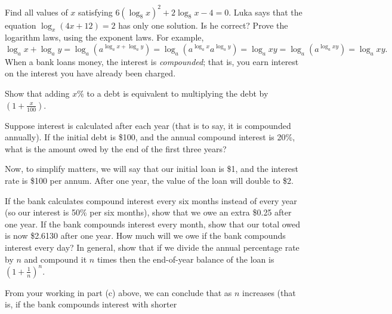 \begin{questions}
  \question Find all values of $ x $ satisfying $ 6(\log_8 x)^2 + 2 \log_8 x - 4 = 0 $.
  \question Luka says that the equation $ \log_x (4x + 12) = 2 $ has only one solution. Is he correct?
  \question Prove the logarithm laws, using the exponent laws. For example,
            \begin{displaymath}
              \log_a x + \log_a y = \log_a (a^{\log_a x + \log_a y}) = \log_a (a^{\log_a x}a^{\log_a y}) = \log_a xy = \log_ a (a^{\log_a xy}) = \log_a xy.
            \end{displaymath}
  \clearpage
  \question When a bank loans money, the interest is \emph{compounded}; that is, you earn interest on the interest you have already
            been charged.
    \begin{parts}
      \item Show that adding $ x\% $ to a debt is equivalent to multiplying the debt by $ (1 + \frac{x}{100}) $.
      \item Suppose interest is calculated after each year (that is to say, it is compounded annually). If the initial
            debt is \$100, and the annual compound interest is 20\%, what is the amount owed by the end of the first three years?
      \item Now, to simplify matters, we will say that our initial loan is \$1, and the interest rate is \$100 per annum. After
            one year, the value of the loan will double to \$2.
        \begin{subparts}
          \subpart If the bank calculates compound interest every six months instead of every year (so our interest is 50\% per
                   six months), show that we owe an extra \$0.25 after one year.
          \subpart If the bank compounds interest every month, show that our total owed is now \$2.6130 after one year.
          \subpart How much will we owe if the bank compounds interest every day?
          \subpart In general, show that if we divide the annual percentage rate by $ n $ and compound it $ n $ times then the end-of-year
                   balance of the loan is $ (1 + \frac{1}{n})^n $.
        \end{subparts}
      \item From your working in part (c) above, we can conclude that as $ n $ increases (that is, if the bank compounds interest with shorter

\end{parts}
\end{questions}
